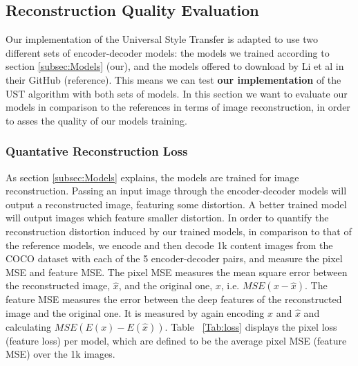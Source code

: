 \subsection{Reconstruction Quality Evaluation}

Our implementation of the Universal Style Transfer is adapted to use two different sets of encoder-decoder models: the models we trained according to section \ref{subsec:Models} (our), and the models offered to download by Li et al in their GitHub (reference). This means we can test \textbf{our implementation} of the UST algorithm with both sets of models. In this section we want to evaluate our models in comparison to the references in terms of image reconstruction, in order to asses the quality of our models training.

\subsubsection{Quantative Reconstruction Loss}
As section \ref{subsec:Models} explains, the models are trained for image reconstruction. Passing an input image through the encoder-decoder models will output a reconstructed image, featuring some distortion. A better trained model will output images which feature smaller distortion. In order to quantify the reconstruction distortion induced by our trained models, in comparison to that of the reference models, we encode and then decode 1k content images from the COCO dataset with each of the 5 encoder-decoder pairs, and measure the pixel MSE and feature MSE. The pixel MSE measures the mean square error between the reconstructed image, $\hat{x}$, and the original one, $x$, i.e. $MSE(x - \hat{x})$. The feature MSE measures the error between the deep features of the reconstructed image and the original one. It is measured by again encoding $x$ and $\hat{x}$ and calculating $MSE(E(x)-E(\hat{x}))$. Table ~\ref{Tab:loss} displays the pixel loss (feature loss) per model, which are defined to be the average pixel MSE (feature MSE) over the 1k images.


